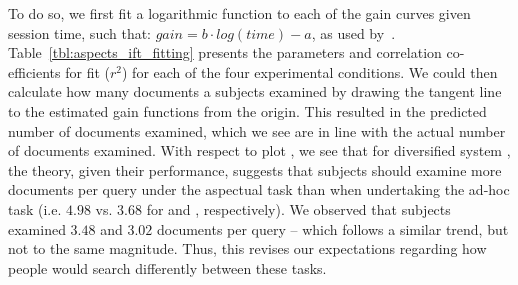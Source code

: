 To do so, we first fit a logarithmic function to each of the gain curves given session time, such that: $gain = b \cdot log(time) - a$, as used by~\cite{athukorala2014ift}. Table~\ref{tbl:aspects_ift_fitting} presents the parameters and correlation co-efficients for fit ($r^2$) for each of the four experimental conditions. We could then calculate how many documents a subjects examined by drawing the tangent line to the estimated gain functions from the origin. This resulted in the predicted number of documents examined, which we see are in line with the actual number of documents examined. With respect to plot , we see that for diversified system , the theory, given their performance, suggests that subjects should examine more documents per query under the aspectual task  than when undertaking the ad-hoc task  (i.e. $4.98$ vs. $3.68$ for  and , respectively). We observed that subjects examined $3.48$ and $3.02$ documents per query -- which follows a similar trend, but not to the same magnitude. Thus, this revises our expectations regarding how people would search differently between these tasks.

